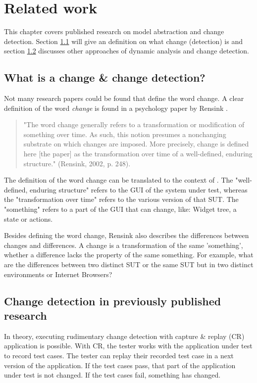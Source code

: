 \chapter{Related work}

This chapter covers published research on model abstraction and change detection. Section \ref{sec:what-is-change} will give an definition on what change (detection) is and section \ref{sec:change-detection-research} discusses other approaches of dynamic analysis and change detection. 
\section{What is a change \& change detection?} \label{sec:what-is-change}

Not many research papers could be found that define the word change. A clear definition of the word \textit{change} is found in a psychology paper by Rensink \cite{rensink2002change}.

\begin{quote}
    "The word change generally refers to a transformation or modification of something over time. As such, this notion presumes a nonchanging substrate on which changes are imposed. More precisely, change is defined here [the paper] as the transformation over time of a well-defined, enduring structure." (Rensink, 2002, p. 248).
\end{quote}

The definition of the word change can be translated to the context of \testar. The "well-defined, enduring structure" refers to the GUI of the system under test, whereas the "transformation over time" refers to the various version of that SUT. The "something" refers to a part of the GUI that can change, like: Widget tree, a state or actions. 

Besides defining the word change, Rensink also describes the differences between changes and differences. A change is a transformation of the same 'something', whether a difference lacks the property of the same something. For example, what are the differences between two distinct SUT or the same SUT but in two distinct environments or Internet Browsers?

\section{Change detection in previously published research} \label{sec:change-detection-research}

In theory, executing rudimentary change detection with capture \& replay (CR) application is possible. With CR, the tester works with the application under test to record test cases. The tester can replay their recorded test case in a next version of the application. If the test cases pass, that part of the application under test is not changed. If the test cases fail, something has changed. 

